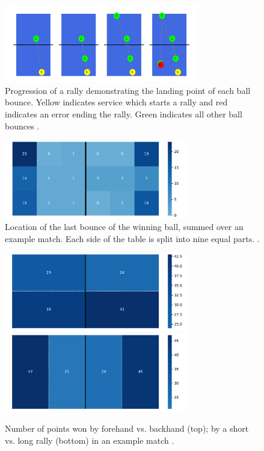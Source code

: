 \begin{figure}[ht]
\centering

\includegraphics[width=8.5cm]{plots/tablesequence.pdf}
\caption{Progression of a rally demonstrating the landing point of each ball bounce. Yellow indicates service which starts a rally and red indicates an error ending the rally. Green indicates all other ball bounces \cite{OSAI}.}

\label{fig:sequence}
\end{figure}

\begin{figure}[ht]
\centering

\includegraphics[width=8cm]{plots/tableheatmaplot.pdf}
\caption{Location of the last bounce of the winning ball, summed over an example match. Each side of the table is split into nine equal parts. \cite{OSAI}.}

\label{fig:pos}
\end{figure}


\begin{figure}[t]
\centering
\includegraphics[width=8cm]{plots/forehandvsbackhand.pdf}
\includegraphics[width=8cm]{plots/shortvslongrally.pdf}
\caption{Number of points won by forehand vs. backhand (top);  by a short vs. long rally (bottom) in an example match \cite{OSAI}.}

\label{fig:svlr}
\end{figure}

